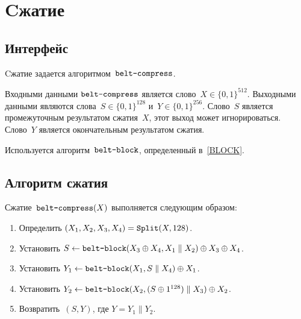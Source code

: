 \section{Cжатие}\label{COMPR}

\subsection{Интерфейс}\label{COMPR.IFace}

Cжатие задается алгоритмом~$\texttt{belt-compress}$.

Входными данными $\texttt{belt-compress}$ является слово~$X\in\{0,1\}^{512}$.
%
Выходными данными являются слова~$S\in\{0,1\}^{128}$ 
и~$Y\in\{0,1\}^{256}$. 
%
Слово~$S$ является промежуточным результатом сжатия~$X$,
этот выход может игнорироваться.
%
Слово~$Y$ является окончательным результатом сжатия.

Используется алгоритм~$\texttt{belt-block}$, определенный в~\ref{BLOCK}.

\subsection{Алгоритм сжатия}\label{COMPR.Alg}

Сжатие~$\texttt{belt-compress}(X)$ выполняется следующим образом:
%
\begin{enumerate}
\item
Определить $(X_1,X_2,X_3,X_4)=\mathop{\texttt{Split}}\nolimits(X,128)$.
\item
Установить
$S\leftarrow\texttt{belt-block}(X_3\oplus X_4,X_1\parallel X_2)\oplus X_3\oplus X_4$.
\item
Установить
$Y_1\leftarrow\texttt{belt-block}(X_1,S\parallel X_4)\oplus X_1$.
\item
Установить
$Y_2\leftarrow\texttt{belt-block}(X_2,(S\oplus 1^{128})\parallel X_3)\oplus X_2$.
\item
Возвратить~$(S,Y)$, где $Y=Y_1\parallel Y_2$.
\end{enumerate}

